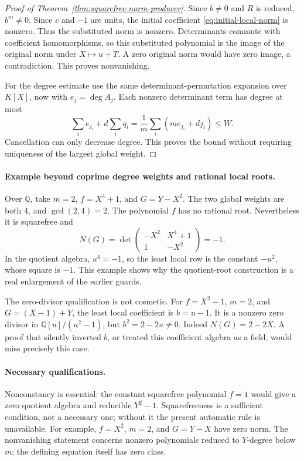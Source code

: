 \begin{proof}[Proof of Theorem~\ref{thm:squarefree-norm-producer}]
Since \(b\ne0\) and \(R\) is reduced, \(b^m\ne0\).
Since \(c\) and \(-1\) are units, the initial coefficient
\eqref{eq:initial-local-norm} is nonzero.  Thus the substituted norm is
nonzero.  Determinants commute with coefficient homomorphisms, so this
substituted polynomial is the image of the original norm under
\(X\mapsto u+T\).  A zero original norm would have zero image, a
contradiction.  This proves nonvanishing.

For the degree estimate use the same determinant-permutation expansion
over \(K[X]\), now with \(e_j=\deg A_j\).  Each nonzero determinant
term has degree at most
\[
 \sum_i e_{j_i}+d\sum_iq_i
       =\frac1m\sum_i(me_{j_i}+dj_i)\leq W.
\]
Cancellation can only decrease degree.  This proves the bound without
requiring uniqueness of the largest global weight.
\end{proof}

\paragraph{Example beyond coprime degree weights and rational local roots.}
Over \(\mathbb Q\), take \(m=2\), \(f=X^4+1\), and
\(G=Y-X^2\).  The two global weights are both \(4\), and
\(\gcd(2,4)=2\).  The polynomial \(f\) has no rational root.
Nevertheless it is squarefree and
\[
 N(G)=\det\begin{pmatrix}-X^2&X^4+1\\1&-X^2\end{pmatrix}=-1.
\]
In the quotient algebra, \(u^4=-1\), so the least local row is the
constant \(-u^2\), whose square is \(-1\).  This example shows why the
quotient-root construction is a real enlargement of the earlier guards.

The zero-divisor qualification is not cosmetic.  For
\(f=X^2-1\), \(m=2\), and \(G=(X-1)+Y\), the least local coefficient
is \(b=u-1\).  It is a nonzero zero divisor in
\(\mathbb Q[u]/(u^2-1)\), but \(b^2=2-2u\ne0\).  Indeed
\(N(G)=2-2X\).  A proof that silently inverted \(b\), or treated
this coefficient algebra as a field, would miss precisely this case.

\paragraph{Necessary qualifications.}
Nonconstancy is essential: the constant squarefree polynomial \(f=1\)
would give a zero quotient algebra and reducible \(Y^2-1\).
Squarefreeness is a sufficient condition, not a necessary one; without
it the present automatic rule is unavailable.  For example,
\(f=X^2\), \(m=2\), and \(G=Y-X\) have zero norm.
The nonvanishing statement concerns nonzero polynomials reduced to
\(Y\)-degree below \(m\); the defining equation itself has zero class.

